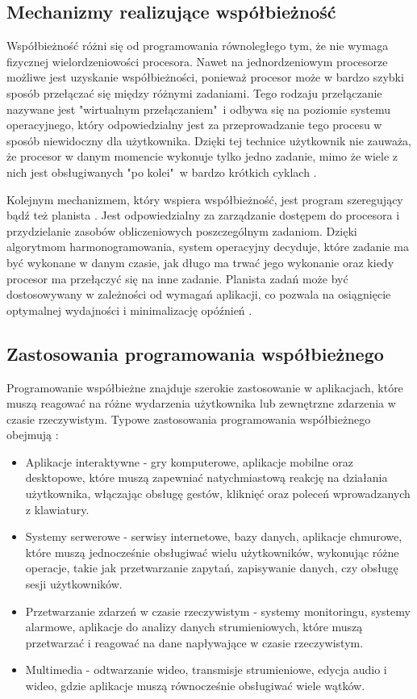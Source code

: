 \subsection{Mechanizmy realizujące współbieżność}
Współbieżność różni się od programowania równoległego tym, że nie wymaga fizycznej wielordzeniowości procesora. Nawet na jednordzeniowym procesorze możliwe jest uzyskanie współbieżności, ponieważ procesor może w bardzo szybki sposób przełączać się między różnymi zadaniami. Tego rodzaju przełączanie nazywane jest "wirtualnym przełączaniem"\ i odbywa się na poziomie systemu operacyjnego, który odpowiedzialny jest za przeprowadzanie tego procesu w sposób niewidoczny dla użytkownika. Dzięki tej technice użytkownik nie zauważa, że procesor w danym momencie wykonuje tylko jedno zadanie, mimo że wiele z nich jest obsługiwanych "po kolei"\ w bardzo krótkich cyklach \cite{ConcurrencyInAction, RustAtomicsAndLocks}.

Kolejnym mechanizmem, który wspiera współbieżność, jest program szeregujący bądź też planista . Jest odpowiedzialny za zarządzanie dostępem do procesora i przydzielanie zasobów obliczeniowych poszczególnym zadaniom. Dzięki algorytmom harmonogramowania, system operacyjny decyduje, które zadanie ma być wykonane w danym czasie, jak długo ma trwać jego wykonanie oraz kiedy procesor ma przełączyć się na inne zadanie. Planista zadań może być dostosowywany w zależności od wymagań aplikacji, co pozwala na osiągnięcie optymalnej wydajności i minimalizację opóźnień \cite{ConcurrencyInAction}.

\subsection{Zastosowania programowania współbieżnego}
Programowanie współbieżne znajduje szerokie zastosowanie w aplikacjach, które muszą reagować na różne wydarzenia użytkownika lub zewnętrzne zdarzenia w czasie rzeczywistym. Typowe zastosowania programowania współbieżnego obejmują \cite{ZastosowanieWspolbieznosci, ConcurrencyInAction}:
\begin{itemize}
    \item Aplikacje interaktywne - gry komputerowe, aplikacje mobilne oraz desktopowe, które muszą zapewniać natychmiastową reakcję na działania użytkownika, włączając obsługę gestów, kliknięć oraz poleceń wprowadzanych z klawiatury.
    \item Systemy serwerowe - serwisy internetowe, bazy danych, aplikacje chmurowe, które muszą jednocześnie obsługiwać wielu użytkowników, wykonując różne operacje, takie jak przetwarzanie zapytań, zapisywanie danych, czy obsługę sesji użytkowników.
    \item Przetwarzanie zdarzeń w czasie rzeczywistym - systemy monitoringu, systemy alarmowe, aplikacje do analizy danych strumieniowych, które muszą przetwarzać i reagować na dane napływające w czasie rzeczywistym.
    \item Multimedia - odtwarzanie wideo, transmisje strumieniowe, edycja audio i wideo, gdzie aplikacje muszą równocześnie obsługiwać wiele wątków.
\end{itemize}


